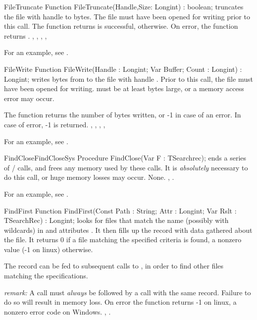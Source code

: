 \begin{function}{FileTruncate}
\Declaration
Function FileTruncate(Handle,Size: Longint) : boolean;
\Description
{} truncates the file with handle  to
 bytes. The file must have been opened for writing prior
to this call. The function returns  is successful, 
otherwise.
\Errors
On error, the function returns .
\SeeAlso
{}, , , 
, 
\end{function}

For an example, see .

\begin{function}{FileWrite}
\Declaration
Function FileWrite(Handle : Longint; Var Buffer; Count : Longint) : Longint;
\Description
{} writes  bytes from  to the file with
handle . Prior to this call, the file must have been opened
for writing.  must be at least  bytes large, or
a memory access error may occur.

The function returns the number of bytes written, or -1 in case of an
error.
\Errors
In case of error, -1 is returned.
\SeeAlso
{}, , 
, , 
\end{function}

For an example, see .

\begin{procedurel}{FindClose}{FindCloseSys}
\Declaration
Procedure FindClose(Var F : TSearchrec);
\Description
{} ends a series of / calls,
and frees any memory used by these calls. It is {\em absolutely} necessary
to do this call, or huge memory losses may occur.
\Errors
None.
\SeeAlso
{}, .
\end{procedurel}

For an example, see .

\begin{function}{FindFirst}
\Declaration
Function FindFirst(Const Path : String; Attr : Longint; Var Rslt : TSearchRec) : Longint;
\Description
{} looks for files that match the name (possibly with
wildcards) in  and attributes . It then fills up the
 record with data gathered about the file. It returns 0 if a file
matching the specified criteria is found, a nonzero value (-1 on linux)
otherwise.

The  record can be fed to subsequent calls to , in
order to find other files matching the specifications.

{\em remark:} A  call must {\em always} be followed by a
 call with the same  record. Failure to do so will
result in memory loss.
\Errors
On error the function returns -1 on linux, a nonzero error code on Windows.
\SeeAlso
{}, .
\end{function}

